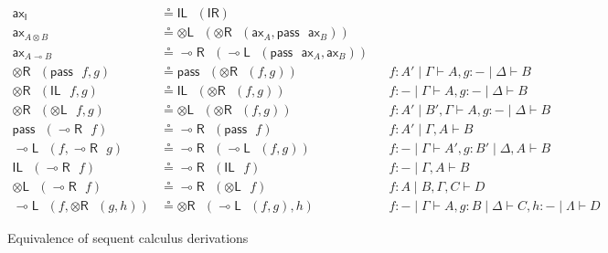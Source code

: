 \documentclass[submission,copyright,creativecommons]{eptcs}
\theoremstyle{definition}
\newcommand{\tl}{\otimes \mathsf{L}}
\newcommand{\tr}{\otimes \mathsf{R}}
\newcommand{\lright}{{\multimap}\mathsf{R}}
\newcommand{\lleft}{{\multimap}\mathsf{L}}
\newcommand{\pass}{\mathsf{pass}}
\newcommand{\unitl}{\mathsf{IL}}
\newcommand{\unitr}{\mathsf{IR}}
\newcommand{\ax}{\mathsf{ax}}
\newcommand{\ot}{\otimes}
\newcommand{\lolli}{\multimap}
\newcommand{\I}{\mathsf{I}}
\newcommand{\niccolo}[1]{{\color{red}\textbf{Niccol{\`o}: }#1}}
\begin{document}
\begin{figure}[t!]
\begin{align*}
  \ax_{\I} &\circeq \unitl \text{ } (\unitr)
  \\
  \ax_{A \ot B} &\circeq \tl \text{ } (\tr \text{ } (\ax_{A} , \pass \text{ } \ax_{B}))
  \\
  \ax_{A \lolli B} &\circeq \lright \text{ } (\lleft \text{ } (\pass \text{ } \ax_{A}, \ax_{B} ))
  \\
  \tr \text{ } (\pass \text{ } f, g) &\circeq \pass \text{ } (\tr \text{ } (f, g)) &&f : A' \mid \Gamma \vdash A, g : - \mid \Delta \vdash B
  \\
  \tr \text{ } (\unitl \text{ } f, g) &\circeq \unitl \text{ } (\tr \text{ } (f , g)) &&f : - \mid \Gamma \vdash A , g : - \mid \Delta \vdash B
  \\
  \tr \text{ } (\tl \text{ } f, g) &\circeq \tl \text{ } (\tr \text{ } (f , g)) &&f : A' \mid B' , \Gamma \vdash A , g : - \mid \Delta \vdash B
  \\
  \pass \text{ } (\lright \text{ } f) &\circeq \lright \text{ } (\pass \text{ } f) &&f : A' \mid \Gamma , A \vdash B
  \\
  \lleft \text{ } (f, \lright \text{ } g) &\circeq \lright \text{ } (\lleft \text{ } (f, g)) &&f : - \mid \Gamma \vdash A', g : B' \mid \Delta , A \vdash B
  \\
  \unitl \text{ } (\lright \text{ } f) &\circeq \lright \text{ } (\unitl \text{ } f) &&f : - \mid \Gamma , A \vdash B
  \\
  \tl \text{ } (\lright \text{ } f) &\circeq \lright \text{ } (\tl \text{ } f) &&f : A \mid B , \Gamma , C \vdash D
  \\
  \lleft \text{ } (f, \tr \text{ } (g, h)) &\circeq \tr \text{ } (\lleft \text{ } (f , g), h) &&f: - \mid \Gamma \vdash A, g : B \mid \Delta \vdash C, h : - \mid \Lambda \vdash D
\end{align*}
\caption{Equivalence of sequent calculus derivations}
\label{fig:circeq}
\end{figure}
\end{document}
